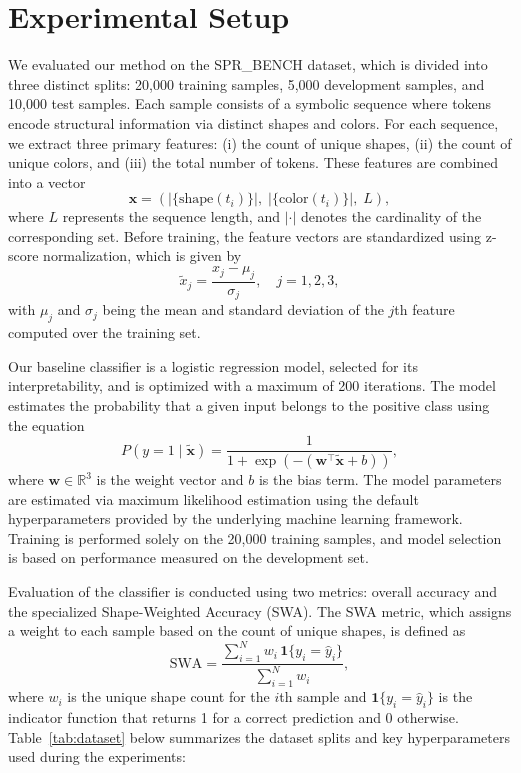 \documentclass{article}
\begin{document}
\section{Experimental Setup}
We evaluated our method on the SPR\_BENCH dataset, which is divided into three distinct splits: 20,000 training samples, 5,000 development samples, and 10,000 test samples. Each sample consists of a symbolic sequence where tokens encode structural information via distinct shapes and colors. For each sequence, we extract three primary features: (i) the count of unique shapes, (ii) the count of unique colors, and (iii) the total number of tokens. These features are combined into a vector 
\[
\mathbf{x} = \left(\left|\{\text{shape}(t_i)\}\right|,\;\left|\{\text{color}(t_i)\}\right|,\; L\right),
\]
where \(L\) represents the sequence length, and \(|\cdot|\) denotes the cardinality of the corresponding set. Before training, the feature vectors are standardized using z-score normalization, which is given by
\[
\tilde{x}_j = \frac{x_j - \mu_j}{\sigma_j}, \quad j=1,2,3,
\]
with \(\mu_j\) and \(\sigma_j\) being the mean and standard deviation of the \(j\)th feature computed over the training set.

Our baseline classifier is a logistic regression model, selected for its interpretability, and is optimized with a maximum of 200 iterations. The model estimates the probability that a given input belongs to the positive class using the equation
\[
P(y=1 \mid \tilde{\mathbf{x}}) = \frac{1}{1 + \exp\left(-\left(\mathbf{w}^\top \tilde{\mathbf{x}} + b\right)\right)},
\]
where \(\mathbf{w} \in \mathbb{R}^3\) is the weight vector and \(b\) is the bias term. The model parameters are estimated via maximum likelihood estimation using the default hyperparameters provided by the underlying machine learning framework. Training is performed solely on the 20,000 training samples, and model selection is based on performance measured on the development set.

Evaluation of the classifier is conducted using two metrics: overall accuracy and the specialized Shape-Weighted Accuracy (SWA). The SWA metric, which assigns a weight to each sample based on the count of unique shapes, is defined as
\[
\text{SWA} = \frac{\sum_{i=1}^{N} w_i\, \mathbf{1}\{y_i = \hat{y}_i\}}{\sum_{i=1}^{N} w_i},
\]
where \(w_i\) is the unique shape count for the \(i\)th sample and \(\mathbf{1}\{y_i = \hat{y}_i\}\) is the indicator function that returns 1 for a correct prediction and 0 otherwise. Table~\ref{tab:dataset} below summarizes the dataset splits and key hyperparameters used during the experiments:
\end{document}

